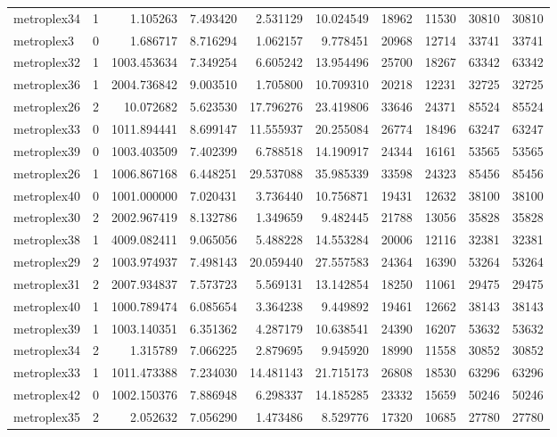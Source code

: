 \begin{longtable}{|l|r|r|r|r|r|r|r|r|r|}
metroplex34 & 1 & 1.105263 & 7.493420 & 2.531129 & 10.024549 & 18962 & 11530 & 30810 & 30810 \\
metroplex3 & 0 & 1.686717 & 8.716294 & 1.062157 & 9.778451 & 20968 & 12714 & 33741 & 33741 \\
metroplex32 & 1 & 1003.453634 & 7.349254 & 6.605242 & 13.954496 & 25700 & 18267 & 63342 & 63342 \\
metroplex36 & 1 & 2004.736842 & 9.003510 & 1.705800 & 10.709310 & 20218 & 12231 & 32725 & 32725 \\
metroplex26 & 2 & 10.072682 & 5.623530 & 17.796276 & 23.419806 & 33646 & 24371 & 85524 & 85524 \\
metroplex33 & 0 & 1011.894441 & 8.699147 & 11.555937 & 20.255084 & 26774 & 18496 & 63247 & 63247 \\
metroplex39 & 0 & 1003.403509 & 7.402399 & 6.788518 & 14.190917 & 24344 & 16161 & 53565 & 53565 \\
metroplex26 & 1 & 1006.867168 & 6.448251 & 29.537088 & 35.985339 & 33598 & 24323 & 85456 & 85456 \\
metroplex40 & 0 & 1001.000000 & 7.020431 & 3.736440 & 10.756871 & 19431 & 12632 & 38100 & 38100 \\
metroplex30 & 2 & 2002.967419 & 8.132786 & 1.349659 & 9.482445 & 21788 & 13056 & 35828 & 35828 \\
metroplex38 & 1 & 4009.082411 & 9.065056 & 5.488228 & 14.553284 & 20006 & 12116 & 32381 & 32381 \\
metroplex29 & 2 & 1003.974937 & 7.498143 & 20.059440 & 27.557583 & 24364 & 16390 & 53264 & 53264 \\
metroplex31 & 2 & 2007.934837 & 7.573723 & 5.569131 & 13.142854 & 18250 & 11061 & 29475 & 29475 \\
metroplex40 & 1 & 1000.789474 & 6.085654 & 3.364238 & 9.449892 & 19461 & 12662 & 38143 & 38143 \\
metroplex39 & 1 & 1003.140351 & 6.351362 & 4.287179 & 10.638541 & 24390 & 16207 & 53632 & 53632 \\
metroplex34 & 2 & 1.315789 & 7.066225 & 2.879695 & 9.945920 & 18990 & 11558 & 30852 & 30852 \\
metroplex33 & 1 & 1011.473388 & 7.234030 & 14.481143 & 21.715173 & 26808 & 18530 & 63296 & 63296 \\
metroplex42 & 0 & 1002.150376 & 7.886948 & 6.298337 & 14.185285 & 23332 & 15659 & 50246 & 50246 \\
metroplex35 & 2 & 2.052632 & 7.056290 & 1.473486 & 8.529776 & 17320 & 10685 & 27780 & 27780 \\

\end{longtable}
